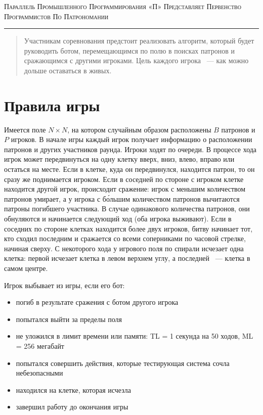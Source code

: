 \documentclass[a4paper,12pt]{article}
\begin{document}
\begin{center}
{\small\textsc{Параллель Промышленного Программирования «П» Представляет Первенство Программистов По Патрономании}}
\vskip 1pt \hrule \vskip 3pt

\end{center}
\begin{abstract}
Участникам соревнования предстоит реализовать алгоритм, который будет руководить ботом, перемещающимся по полю в поисках патронов и сражающимся с другими игроками. Цель каждого игрока ~--- как можно дольше оставаться в живых.
\end{abstract}
\section{Правила игры}
Имеется поле $N\times N$, на котором случайным образом расположены $B$ патронов и $P$ игроков. В начале игры каждый игрок получает информацию о расположении патронов и других участников раунда. Игроки ходят по очереди. В процессе хода игрок может передвинуться на одну клетку вверх, вниз, влево, вправо или остаться на месте. Если в клетке, куда он передвинулся, находится патрон, то он сразу же поднимается игроком. Если в соседней по стороне с игроком клетке находится другой игрок, происходит сражение: игрок с меньшим количеством патронов умирает, а у игрока с б\'{о}льшим количеством патронов вычитаются патроны погибшего участника. В случае одинакового количества патронов, они обнуляются и начинается следующий ход (оба игрока выживают). Если в соседних по стороне клетках находится более двух игроков, битву начинает тот, кто сходил последним и сражается со всеми соперниками по часовой стрелке, начиная сверху. С некоторого хода у игрового поля по спирали исчезает одна клетка: первой исчезает клетка в левом верхнем углу, а последней ~--- клетка в самом центре.
\begin{flushleft}
Игрок выбывает из игры, если его бот:
\begin{itemize}
\item погиб в результате сражения с ботом другого игрока
\item попытался выйти за пределы поля
\item не уложился в лимит времени или памяти:
TL = 1 секунда на 50 ходов, ML = 256 мегабайт
\item попытался совершить действия, которые тестирующая система сочла небезопасными
\item находился на клетке, которая исчезла
\item завершил работу до окончания игры
\end{itemize}
\end{flushleft}
\end{document}
